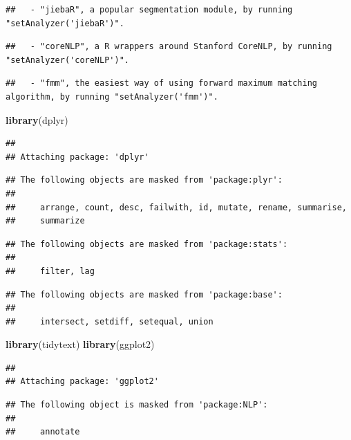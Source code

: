 \documentclass[]{article}
\newenvironment{Shaded}{\begin{snugshade}}{\end{snugshade}}
\newcommand{\KeywordTok}[1]{\textcolor[rgb]{0.13,0.29,0.53}{\textbf{#1}}}
\newcommand{\NormalTok}[1]{#1}
\begin{document}
\begin{verbatim}
##   - "jiebaR", a popular segmentation module, by running "setAnalyzer('jiebaR')".
\end{verbatim}

\begin{verbatim}
##   - "coreNLP", a R wrappers around Stanford CoreNLP, by running "setAnalyzer('coreNLP')".
\end{verbatim}

\begin{verbatim}
##   - "fmm", the easiest way of using forward maximum matching algorithm, by running "setAnalyzer('fmm')".
\end{verbatim}

\begin{Shaded}
\begin{Highlighting}[]
\KeywordTok{library}\NormalTok{(dplyr)}
\end{Highlighting}
\end{Shaded}

\begin{verbatim}
## 
## Attaching package: 'dplyr'
\end{verbatim}

\begin{verbatim}
## The following objects are masked from 'package:plyr':
## 
##     arrange, count, desc, failwith, id, mutate, rename, summarise,
##     summarize
\end{verbatim}

\begin{verbatim}
## The following objects are masked from 'package:stats':
## 
##     filter, lag
\end{verbatim}

\begin{verbatim}
## The following objects are masked from 'package:base':
## 
##     intersect, setdiff, setequal, union
\end{verbatim}

\begin{Shaded}
\begin{Highlighting}[]
\KeywordTok{library}\NormalTok{(tidytext)}
\KeywordTok{library}\NormalTok{(ggplot2)}
\end{Highlighting}
\end{Shaded}

\begin{verbatim}
## 
## Attaching package: 'ggplot2'
\end{verbatim}

\begin{verbatim}
## The following object is masked from 'package:NLP':
## 
##     annotate
\end{verbatim}
\end{document}
